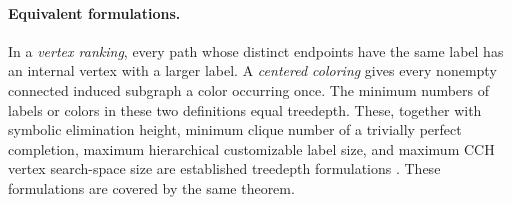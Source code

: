 \paragraph{Equivalent formulations.}
In a \emph{vertex ranking}, every path whose distinct endpoints
have the same label has an internal vertex with a larger label.
A \emph{centered coloring} gives every nonempty connected induced
subgraph a color occurring once. The minimum numbers of
labels or colors in these two definitions equal treedepth.
These, together with symbolic elimination height,
minimum clique number of a trivially perfect completion, maximum
hierarchical customizable label size, and maximum CCH vertex
search-space size are established treedepth formulations
\cite{Reidl2014,BodlaenderRankings,BlumStorandt2023}. These formulations
are covered by the same theorem.
